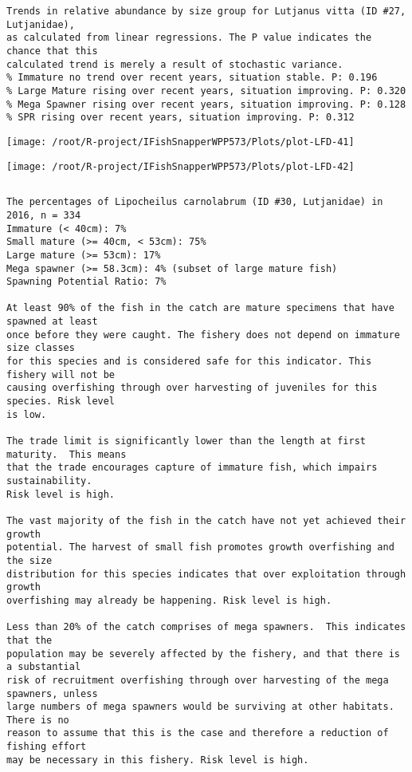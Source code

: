 \documentclass{report}\usepackage[]{graphicx}\usepackage[]{color}
\makeatletter
\def\maxwidth{ %
  \ifdim\Gin@nat@width>\linewidth
    \linewidth
  \else
    \Gin@nat@width
  \fi
}
\newenvironment{kframe}{%
 \def\at@end@of@kframe{}%
 \ifinner\ifhmode%
  \def\at@end@of@kframe{\end{minipage}}%
  \begin{minipage}{\columnwidth}%
 \fi\fi%
 \def\FrameCommand##1{\hskip\@totalleftmargin \hskip-\fboxsep
 \colorbox{shadecolor}{##1}\hskip-\fboxsep
     \hskip-\linewidth \hskip-\@totalleftmargin \hskip\columnwidth}%
 \MakeFramed {\advance\hsize-\width
   \@totalleftmargin\z@ \linewidth\hsize
   \@setminipage}}%
 {\par\unskip\endMakeFramed%
 \at@end@of@kframe}
\newenvironment{knitrout}{}{} %
\makeatother
\begin{document}
\begin{knitrout}
\begin{kframe}
\begin{verbatim}
Trends in relative abundance by size group for Lutjanus vitta (ID #27, Lutjanidae),
as calculated from linear regressions. The P value indicates the chance that this
calculated trend is merely a result of stochastic variance.
% Immature no trend over recent years, situation stable. P: 0.196
% Large Mature rising over recent years, situation improving. P: 0.320
% Mega Spawner rising over recent years, situation improving. P: 0.128
% SPR rising over recent years, situation improving. P: 0.312
\end{verbatim}
\end{kframe}
\texttt{[image: /root/R-project/IFishSnapperWPP573/Plots/plot-LFD-41]} 

\texttt{[image: /root/R-project/IFishSnapperWPP573/Plots/plot-LFD-42]} 
\begin{kframe}\begin{verbatim}
\end{verbatim}
\end{kframe}
\clearpage
\newpage
\begin{kframe}\begin{verbatim}The percentages of Lipocheilus carnolabrum (ID #30, Lutjanidae) in 2016, n = 334
Immature (< 40cm): 7%
Small mature (>= 40cm, < 53cm): 75%
Large mature (>= 53cm): 17%
Mega spawner (>= 58.3cm): 4% (subset of large mature fish)
Spawning Potential Ratio: 7%
 
At least 90% of the fish in the catch are mature specimens that have spawned at least
once before they were caught. The fishery does not depend on immature size classes
for this species and is considered safe for this indicator. This fishery will not be
causing overfishing through over harvesting of juveniles for this species. Risk level
is low.

The trade limit is significantly lower than the length at first maturity.  This means
that the trade encourages capture of immature fish, which impairs sustainability.
Risk level is high.

The vast majority of the fish in the catch have not yet achieved their growth
potential. The harvest of small fish promotes growth overfishing and the size
distribution for this species indicates that over exploitation through growth
overfishing may already be happening. Risk level is high.

Less than 20% of the catch comprises of mega spawners.  This indicates that the
population may be severely affected by the fishery, and that there is a substantial
risk of recruitment overfishing through over harvesting of the mega spawners, unless
large numbers of mega spawners would be surviving at other habitats. There is no
reason to assume that this is the case and therefore a reduction of fishing effort
may be necessary in this fishery. Risk level is high.
 

\end{verbatim}
\end{kframe}
\end{knitrout}
\end{document}
